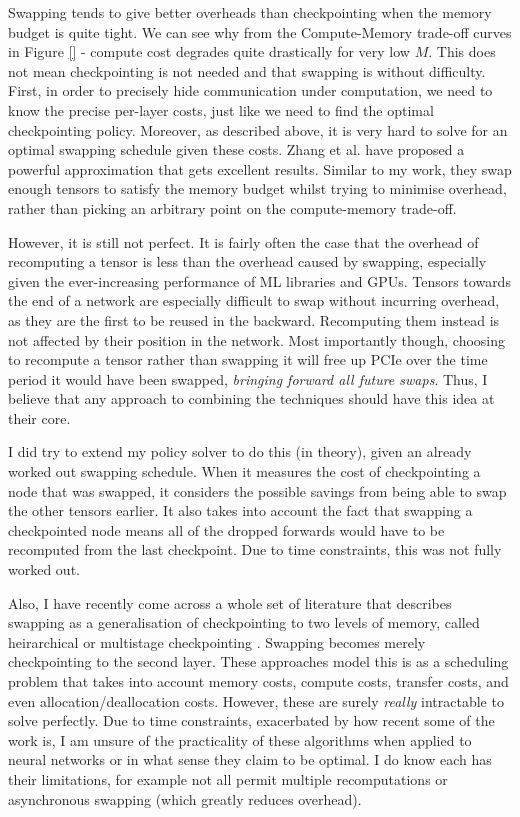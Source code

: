 Swapping tends to give better overheads than checkpointing when the memory budget is quite tight.
We can see why from the Compute-Memory trade-off curves in Figure \ref{} - compute cost degrades quite drastically for very low \(M\).
This does not mean checkpointing is not needed and that swapping is without difficulty.
First, in order to precisely hide communication under computation, we need to know the precise per-layer costs, just like we need to find the optimal checkpointing policy.
Moreover, as described above, it is very hard to solve for an optimal swapping schedule given these costs.
Zhang et al. \cite{Zhang2019} have proposed a powerful approximation that gets excellent results.
Similar to my work, they swap enough tensors to satisfy the memory budget whilst trying to minimise overhead, rather than picking an arbitrary point on the compute-memory trade-off.

However, it is still not perfect.
It is fairly often the case that the overhead of recomputing a tensor is less than the overhead caused by swapping, especially given the ever-increasing performance of ML libraries and GPUs.
Tensors towards the end of a network are especially difficult to swap without incurring overhead, as they are the first to be reused in the backward.
Recomputing them instead is not affected by their position in the network.
Most importantly though, choosing to recompute a tensor rather than swapping it will free up PCIe over the time period it would have been swapped, \textit{bringing forward all future swaps}.
Thus, I believe that any approach to combining the techniques should have this idea at their core.

I did try to extend my policy solver to do this (in theory), given an already worked out swapping schedule.
When it measures the cost of checkpointing a node that was swapped, it considers the possible savings from being able to swap the other tensors earlier.
It also takes into account the fact that swapping a checkpointed node means all of the dropped forwards would have to be recomputed from the last checkpoint.
Due to time constraints, this was not fully worked out.

Also, I have recently come across a whole set of literature that describes swapping as a generalisation of checkpointing to two levels of memory, called heirarchical or multistage checkpointing \cite{Aupy2016, Schanen2016, Kukreja2018, Aupy2019}.
Swapping becomes merely checkpointing to the second layer.
These approaches model this is as a scheduling problem that takes into account memory costs, compute costs, transfer costs, and even allocation/deallocation costs.
However, these are surely \textit{really} intractable to solve perfectly.
Due to time constraints, exacerbated by how recent some of the work is, I am unsure of the practicality of these algorithms when applied to neural networks or in what sense they claim to be optimal.
I do know each has their limitations, for example not all permit multiple recomputations or asynchronous swapping (which greatly reduces overhead).

